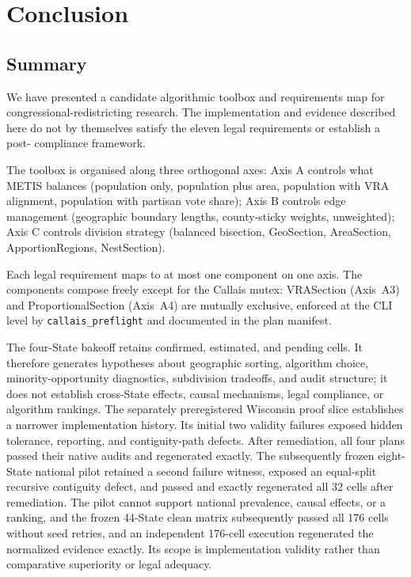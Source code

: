 \section{Conclusion}
\label{sec:conclusion}

\subsection{Summary}

We have presented a candidate algorithmic toolbox and requirements map for
congressional-redistricting research. The implementation and evidence described
here do not by themselves satisfy the eleven legal requirements or establish a
post-\callais{} compliance framework.

The toolbox is organised along three orthogonal axes:
Axis A controls what METIS balances (population only, population plus area,
population with VRA alignment, population with partisan vote share);
Axis B controls edge management (geographic boundary lengths, county-sticky
weights, unweighted);
Axis C controls division strategy (balanced bisection, GeoSection, AreaSection,
ApportionRegions, NestSection).

Each legal requirement maps to at most one component on one axis.
The components compose freely except for the Callais mutex: VRASection (Axis~A3)
and ProportionalSection (Axis~A4) are mutually exclusive, enforced at the CLI
level by \texttt{callais\_preflight} and documented in the plan manifest.

The four-State bakeoff retains confirmed, estimated, and pending cells. It
therefore generates hypotheses about geographic sorting, algorithm choice,
minority-opportunity diagnostics, subdivision tradeoffs, and audit structure;
it does not establish cross-State effects, causal mechanisms, legal compliance,
or algorithm rankings.
The separately preregistered Wisconsin proof slice establishes a narrower
implementation history. Its initial two validity failures exposed hidden
tolerance, reporting, and contiguity-path defects. After remediation, all four
plans passed their native audits and regenerated exactly. The subsequently
frozen eight-State national pilot retained a second failure witness, exposed an
equal-split recursive contiguity defect, and passed and exactly regenerated all
32 cells after remediation. The pilot cannot
support national prevalence, causal effects, or a ranking, and the frozen
44-State clean matrix subsequently passed all 176 cells without seed retries,
and an independent 176-cell execution regenerated the normalized evidence
exactly. Its scope is
implementation validity rather than comparative superiority or legal adequacy.

